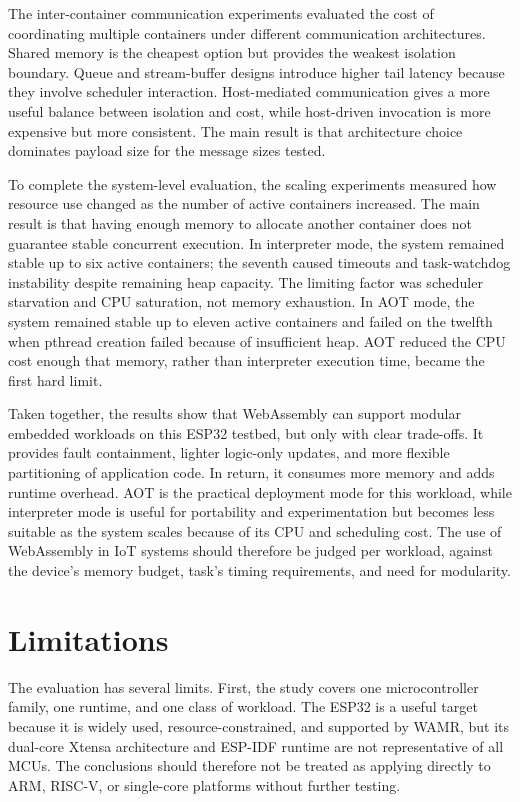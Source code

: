 \documentclass[12pt, a4paper]{report}
\begin{document}
The inter-container communication experiments evaluated the cost of coordinating multiple containers under different communication architectures. Shared memory is the cheapest option but provides the weakest isolation boundary. Queue and stream-buffer designs introduce higher tail latency because they involve scheduler interaction. Host-mediated communication gives a more useful balance between isolation and cost, while host-driven invocation is more expensive but more consistent. The main result is that architecture choice dominates payload size for the message sizes tested.

To complete the system-level evaluation, the scaling experiments measured how resource use changed as the number of active containers increased. The main result is that having enough memory to allocate another container does not guarantee stable concurrent execution. In interpreter mode, the system remained stable up to six active containers; the seventh caused timeouts and task-watchdog instability despite remaining heap capacity. The limiting factor was scheduler starvation and CPU saturation, not memory exhaustion. In AOT mode, the system remained stable up to eleven active containers and failed on the twelfth when pthread creation failed because of insufficient heap. AOT reduced the CPU cost enough that memory, rather than interpreter execution time, became the first hard limit.

Taken together, the results show that WebAssembly can support modular embedded workloads on this ESP32 testbed, but only with clear trade-offs. It provides fault containment, lighter logic-only updates, and more flexible partitioning of application code. In return, it consumes more memory and adds runtime overhead. AOT is the practical deployment mode for this workload, while interpreter mode is useful for portability and experimentation but becomes less suitable as the system scales because of its CPU and scheduling cost. The use of WebAssembly in IoT systems should therefore be judged per workload, against the device's memory budget, task's timing requirements, and need for modularity.

\section{Limitations}

The evaluation has several limits. First, the study covers one microcontroller family, one runtime, and one class of workload. The ESP32 is a useful target because it is widely used, resource-constrained, and supported by WAMR, but its dual-core Xtensa architecture and ESP-IDF runtime are not representative of all MCUs. The conclusions should therefore not be treated as applying directly to ARM, RISC-V, or single-core platforms without further testing.
\end{document}
